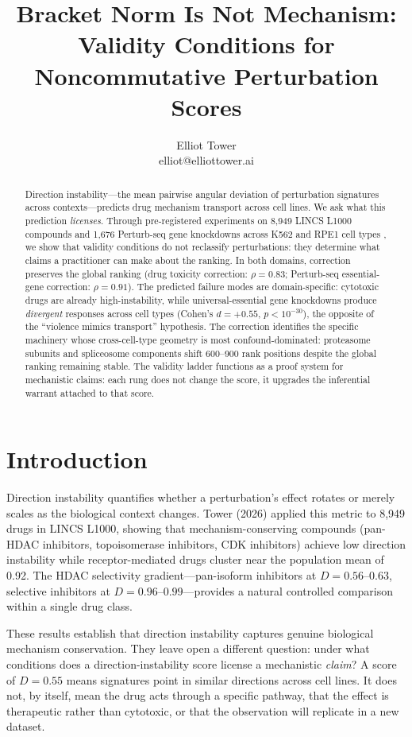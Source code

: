 \documentclass{article}
\title{Bracket Norm Is Not Mechanism:\\ Validity Conditions for Noncommutative Perturbation Scores}
\author{\name Elliot Tower \\
      \email elliot@elliottower.ai}
\begin{document}
\maketitle

\begin{abstract}
Direction instability---the mean pairwise angular deviation of perturbation
signatures across contexts---predicts drug mechanism transport across cell
lines. We ask what this prediction \emph{licenses}. Through pre-registered
experiments on 8{,}949 LINCS L1000 compounds and 1{,}676 Perturb-seq gene
knockdowns across K562 and RPE1 cell types \citep{replogle2022mapping}, we
show that validity conditions do not reclassify perturbations: they determine
what claims a practitioner can make about the ranking. In both domains,
correction preserves the global ranking (drug toxicity correction: $\rho =
0.83$; Perturb-seq essential-gene correction: $\rho = 0.91$). The predicted
failure modes are domain-specific: cytotoxic drugs are already
high-instability, while universal-essential gene knockdowns produce
\emph{divergent} responses across cell types (Cohen's $d = +0.55$, $p <
10^{-30}$), the opposite of the ``violence mimics transport'' hypothesis.
The correction identifies the specific machinery whose cross-cell-type
geometry is most confound-dominated: proteasome subunits and spliceosome
components shift 600--900 rank positions despite the global ranking remaining
stable. The validity ladder functions as a proof system for mechanistic
claims: each rung does not change the score, it upgrades the inferential
warrant attached to that score.
\end{abstract}

\section{Introduction}

Direction instability quantifies whether a perturbation's effect rotates or
merely scales as the biological context changes. Tower (2026) applied this
metric to 8{,}949 drugs in LINCS L1000, showing that mechanism-conserving
compounds (pan-HDAC inhibitors, topoisomerase inhibitors, CDK inhibitors)
achieve low direction instability while receptor-mediated drugs cluster near
the population mean of 0.92. The HDAC selectivity gradient---pan-isoform
inhibitors at $D = 0.56$--$0.63$, selective inhibitors at $D = 0.96$--$0.99$---provides
a natural controlled comparison within a single drug class.

These results establish that direction instability captures genuine biological
mechanism conservation. They leave open a different question: under what
conditions does a direction-instability score license a mechanistic \emph{claim}?
A score of $D = 0.55$ means signatures point in similar directions across cell
lines. It does not, by itself, mean the drug acts through a specific pathway,
that the effect is therapeutic rather than cytotoxic, or that the observation
will replicate in a new dataset.
\end{document}
